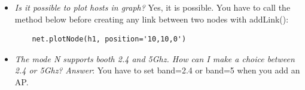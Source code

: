\begin{itemize}
\item \textit{Is it possible to plot hosts in graph?}
Yes, it is possible. You have to call the method below before creating any link between two nodes with addLink():

\begin{verbatim}
    net.plotNode(h1, position='10,10,0')
\end{verbatim}

\item \textit{The mode N supports booth 2.4 and 5Ghz. How can I make a choice between 2.4 or 5Ghz?}
\textit{Answer}: You have to set band=2.4 or band=5 when you add an AP.
\end{itemize}